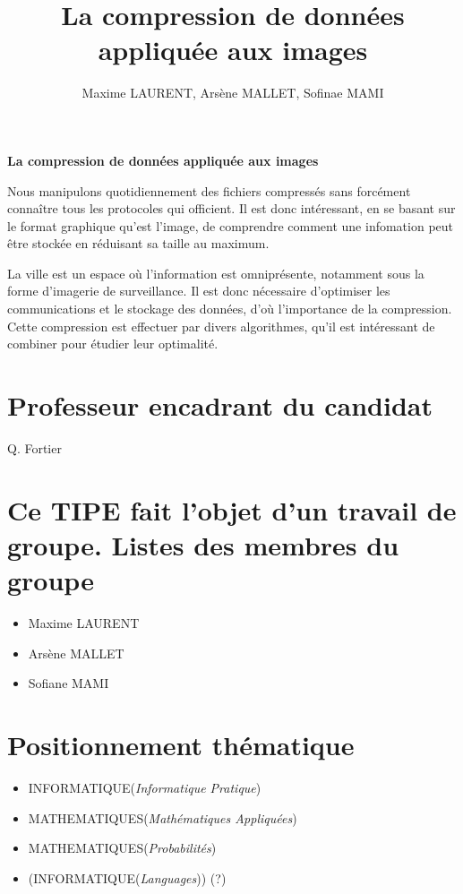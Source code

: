 \documentclass[a4paper, 11pt]{article}
\author{Maxime LAURENT, Arsène MALLET, Sofinae MAMI}
\title{La compression de donn\'ees appliqu\'ee aux images}
\begin{document}
    
\begin{center}
    {\textbf {\LARGE La compression de donn\'ees appliqu\'ee aux images}}
\end{center}

\vspace{5mm}

Nous manipulons quotidiennement des fichiers compressés sans forcément conna\^itre tous les protocoles qui officient. Il est donc intéressant, en se basant sur le format graphique qu'est l'image, de comprendre comment une infomation peut être stockée en réduisant sa taille au maximum.

La ville est un espace où l'information est omniprésente, notamment sous la forme d'imagerie de surveillance. Il est donc nécessaire d'optimiser les communications et le stockage des données, d'où l'importance de la compression. Cette compression est effectuer par divers algorithmes, qu'il est intéressant de combiner pour étudier leur optimalité.

\section*{Professeur encadrant du candidat}
Q. Fortier

\section*{Ce TIPE fait l'objet d'un travail de groupe. \newline Listes des membres du groupe}
\begin{itemize}
    \item Maxime LAURENT
    \item Arsène MALLET
    \item Sofiane MAMI
\end{itemize}

\section*{Positionnement th\'ematique}
\begin{itemize}
    \item INFORMATIQUE(\textit{Informatique Pratique})
    \item MATHEMATIQUES(\textit{Math\'ematiques Appliqu\'ees})
    \item MATHEMATIQUES(\textit{Probabilit\'es})
    \item \scriptsize{(INFORMATIQUE(\textit{Languages}))} (?)
\end{itemize}
\end{document}
